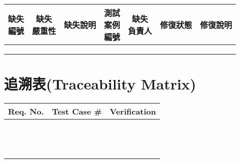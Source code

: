\documentclass{article}
\begin{document}
\begin{tabularx}{\textwidth}{| c | c | X | c | c | c | X |}
	\rowcolor{LightGray}
	\hline
	\makecell{缺失      \\ 編號} & \makecell{缺失 \\ 嚴重性} & 缺失說明 & \makecell{測試\\案例\\編號} & \makecell{缺失 \\ 負責人} & 修復狀態 & 修復說明 \\ \hline
	 &  &  &  &  &  & \\ \hline
	 &  &  &  &  &  & \\ \hline
	 &  &  &  &  &  & \\ \hline
\end{tabularx}

\newpage

\section[追溯表(TRACEABILITY MATRIX)]{追溯表(Traceability Matrix)}

\begin{tabularx}{\textwidth}{| X | X | X |}
	\hline
	Req. No. & Test Case \# & Verification \\ \hline
	         &              &              \\ \hline
	         &              &              \\ \hline
	         &              &              \\ \hline
	         &              &              \\ \hline
	         &              &              \\ \hline
	         &              &              \\ \hline
	         &              &              \\ \hline
	         &              &              \\ \hline
	         &              &              \\ \hline
	         &              &              \\ \hline
	         &              &              \\ \hline
	         &              &              \\ \hline
	         &              &              \\ \hline
\end{tabularx}
\end{document}
